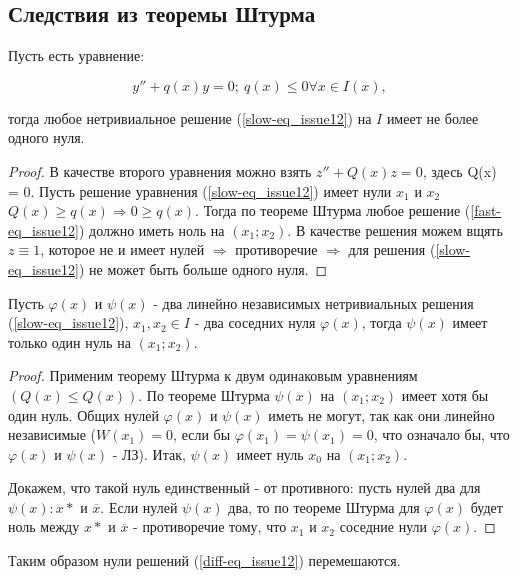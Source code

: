 \subsection{Следствия из теоремы Штурма}

\begin{corollary}\label{zero-quant_in-diff_issue12}
Пусть есть уравнение:

\[y'' + q(x)y = 0; \: q(x) \leq0 \forall x \in I(x),\]

тогда любое нетривиальное решение (\ref{slow-eq_issue12}) на $I$ имеет не более одного нуля.
\end{corollary}

\begin{proof}
В качестве второго уравнения можно взять $z'' + Q(x)z = 0$, здесь Q(x) = 0. Пусть решение уравнения (\ref{slow-eq_issue12}) имеет нули $x_1$ и $x_2$ $Q(x) \geq q(x) \Rightarrow 0 \geq q(x)$. Тогда по теореме Штурма любое решение (\ref{fast-eq_issue12}) должно иметь ноль на $(x_1;x_2)$. В качестве решения можем вщять $z\equiv 1$, которое не и имеет нулей $\Rightarrow$ противоречие $\Rightarrow$ для решения (\ref{slow-eq_issue12}) не может быть больше одного нуля.
\end{proof}

\begin{corollary}\label{line-indep-sol-zeros_issue12}
Пусть $\varphi (x)$ и $\psi (x)$ - два линейно независимых нетривиальных решения (\ref{slow-eq_issue12}), $x_1, x_2 \in I$ - два соседних нуля $\varphi (x)$, тогда $\psi (x)$ имеет только один нуль на $(x_1;x_2)$.
\end{corollary}

\begin{proof}
Применим теорему Штурма к двум одинаковым уравнениям $(Q(x) \leq Q(x))$. По теореме Штурма $\psi (x)$ на $(x_1;x_2)$ имеет хотя бы один нуль. Общих нулей $\varphi (x)$ и $\psi (x)$ иметь не могут, так как они линейно независимые ($W(x_1) = 0$, если бы $\varphi (x_1) = \psi (x_1) = 0$, что означало бы, что $\varphi(x)$ и $\psi(x)$ - ЛЗ). Итак, $\psi (x)$ имеет нуль $x_0$ на $(x_1;x_2)$.

Докажем, что такой нуль единственный - от противного: пусть нулей два для $\psi (x): x*$ и $\overline{x}$. Если нулей $\psi (x)$ два, то по теореме Штурма для $\varphi (x)$ будет ноль между $x*$ и $\overline{x}$ - противоречие тому, что $x_1$ и $x_2$ соседние нули $\varphi (x)$.
\end{proof}

Таким образом нули решений (\ref{diff-eq_issue12}) перемешаются.